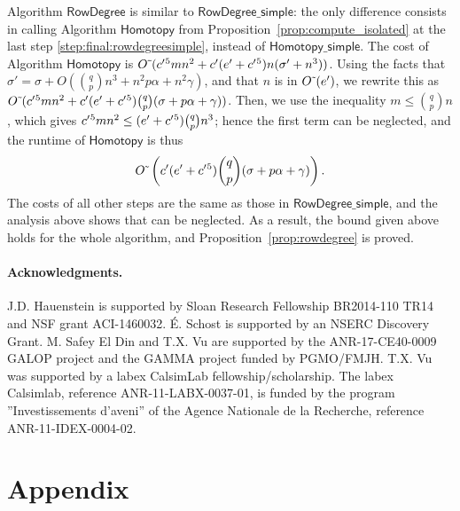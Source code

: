 \documentclass[12pt]{article}
\begin{document}
Algorithm $\mathsf{RowDegree}$ is similar to
$\mathsf{RowDegree\_simple}$: the only difference consists in calling
Algorithm $\mathsf{Homotopy}$ from
Proposition~\ref{prop:compute_isolated} at the last step
\eqref{step:final:rowdegreesimple}, instead of
$\mathsf{Homotopy\_simple}$. The cost of Algorithm
$\mathsf{Homotopy}$ is ${O}{\,\tilde{ }\,}({c'}{}^5 m n^2 + {c'}{}({e'}{}+{c'}{}^5) n(\sigma'
+ n^3))$.  Using the facts that $\sigma'= \sigma +O( {q \choose p} n^3
+ n^2 p \alpha+ n^2\gamma)$, and that $n$ is in ${O}{\,\tilde{ }\,}({e'}{})$, we
rewrite this as ${O}{\,\tilde{ }\,}({c'}{}^5 m n^2 + {c'}{}({e'}{}+{c'}{}^5 ) {q \choose
  p}(\sigma + p \alpha+ \gamma))$.  Then, we use the inequality $m \le
{q \choose p} n$, which gives ${c'}{}^5 m n^2 \le ({e'}{}+{c'}{}^5) {q \choose
  p} n^3$; hence the first term can be neglected, and the runtime of
$\mathsf{Homotopy}$ is thus
\[
{O}{\,\tilde{ }\,}\left( {c'}{}({e'}{}+{c'}{}^5 ) {q \choose p}(\sigma  +  p \alpha+ \gamma)\right).
\]
The costs of all other steps are the same as those in
$\mathsf{RowDegree\_simple}$, and the analysis above shows that can be
neglected. As a result, the bound given above holds for the whole
algorithm, and Proposition~\ref{prop:rowdegree} is proved.

\paragraph*{Acknowledgments.} J.D. Hauenstein is supported by Sloan
Research Fellowship BR2014-110 TR14 and NSF grant
ACI-1460032. \'E. Schost is supported by an NSERC Discovery
Grant. M. Safey El Din and T.X. Vu are supported by the
ANR-17-CE40-0009 GALOP project and the GAMMA project funded by
PGMO/FMJH. T.X. Vu was supported by a labex CalsimLab fellowship/scholarship. The labex Calsimlab, reference ANR-11-LABX-0037-01, is funded by the program ''Investissements d'aveni'' of the Agence Nationale de la Recherche, reference ANR-11-IDEX-0004-02.

\vspace{-0.5cm}



\section*{Appendix}\label{appendix}
\end{document}
